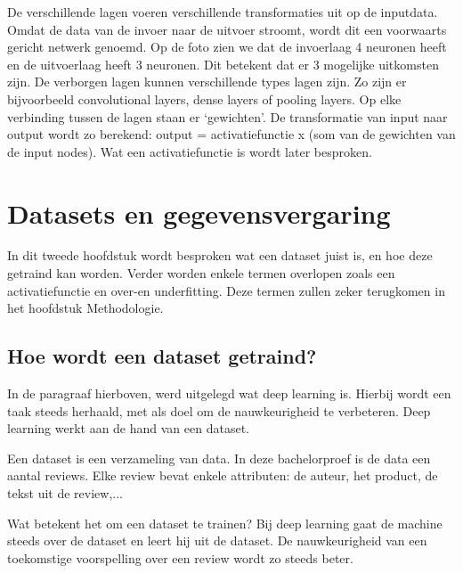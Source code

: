 De verschillende lagen voeren verschillende transformaties uit op de inputdata. Omdat de data van de invoer naar de uitvoer stroomt, wordt dit een voorwaarts gericht netwerk genoemd. Op de foto zien we dat de invoerlaag 4 neuronen heeft en de uitvoerlaag heeft 3 neuronen. Dit betekent dat er 3 mogelijke uitkomsten zijn. De verborgen lagen kunnen verschillende types lagen zijn. Zo zijn er bijvoorbeeld convolutional layers, dense layers of pooling layers. Op elke verbinding tussen de lagen staan er ‘gewichten’. De transformatie van input naar output wordt zo berekend:
output = activatiefunctie x (som van de gewichten van de input nodes). \autocite{Vervoort2017} Wat een activatiefunctie is wordt later besproken. 

\section{Datasets en gegevensvergaring}
\label{sec:datasetsgegevensvergaring}
In dit tweede hoofdstuk wordt besproken wat een dataset juist is, en hoe deze getraind kan worden. Verder worden enkele termen overlopen zoals een activatiefunctie en over-en underfitting. Deze termen zullen zeker terugkomen in het hoofdstuk Methodologie. 

\subsection{Hoe wordt een dataset getraind?}
\label{sec:hoewordtdatasetgetraind}
In de paragraaf hierboven, werd uitgelegd wat deep learning is. Hierbij wordt een taak steeds herhaald, met als doel om de nauwkeurigheid te verbeteren. Deep learning werkt aan de hand van een dataset. 

Een dataset is een verzameling van data. In deze bachelorproef is de data een aantal reviews. Elke review bevat enkele attributen: de auteur, het product, de tekst uit de review,...

Wat betekent het om een dataset te trainen? Bij deep learning gaat de machine steeds over de dataset en leert hij uit de dataset. De nauwkeurigheid van een toekomstige voorspelling over een review wordt zo steeds beter. 

